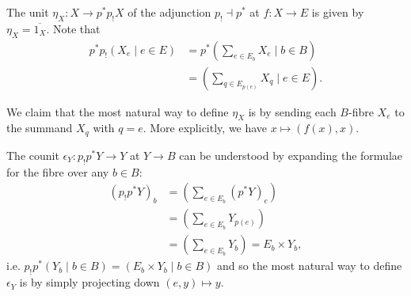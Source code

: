 The unit $\eta_X : X \to p^*p_!X$ of the adjunction $p_! \dashv p^*$ at $f:X\to E$ is given by $\eta_X = \overline{1_X}$. Note that
\begin{align*}
	p^*p_!\left( X_e \mid e\in E \right) &= p^*\left( \sum_{e\in E_b} X_e \mid b\in B \right)\\
		&= \left( \sum_{q\in E_{p(e)}} X_q \mid e\in E \right).
\end{align*}

We claim that the most natural way to define $\eta_X$ is by sending each $B$-fibre $X_e$ to the summand $X_q$ with $q=e$. More explicitly, we have $x \mapsto (f(x),x)$.

The counit $\epsilon_Y : p_!p^*Y \to Y$ at $Y\to B$ can be understood by expanding the formulae for the fibre over any $b\in B$:
\begin{align*}
	(p_!p^*Y)_b &= \left( \sum_{e\in E_b} (p^*Y)_e \right)\\
		&= \left( \sum_{e\in E_b} Y_{p(e)} \right)\\
		&= \left( \sum_{e\in E_b} Y_b \right) = E_b \times Y_b,
\end{align*}
i.e. $p_!p^*\left(Y_b \mid b\in B \right) = \left( E_b\times Y_b \mid b\in B \right)$ and so the most natural way to define $\epsilon_Y$ is by simply projecting down $(e,y) \mapsto y$.

\pagebreak

